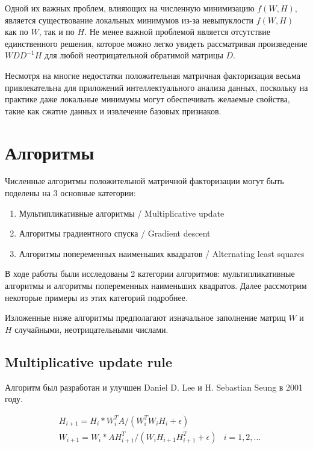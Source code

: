 Одной их важных проблем, влияющих на численную минимизацию $f(W, H)$, является существование локальных минимумов из-за невыпуклости $f(W, H)$ как по $W$, так и по $H$. Не менее важной проблемой является отсутствие единственного решения, которое можно легко увидеть рассматривая произведение $WDD^{− 1}H$ для любой неотрицательной обратимой матрицы $D$.

Несмотря на многие недостатки положительная матричная факторизация весьма привлекательна для приложений интеллектуального анализа данных, поскольку на практике даже локальные минимумы могут обеспечивать желаемые свойства, такие как сжатие данных и извлечение базовых признаков.


\section{Алгоритмы}

Численные алгоритмы положительной матричной факторизации могут быть поделены на 3 основные категории:
\begin{enumerate}
	\item Мультипликативные алгоритмы / Multiplicative update
	\item Алгоритмы градиентного спуска / Gradient descent
	\item Алгоритмы попеременных наименьших квадратов / Alternating least squares
\end{enumerate}

В ходе работы были исследованы 2 категории алгоритмов: мультипликативные алгоритмы и алгоритмы попеременных наименьших квадратов. Далее рассмотрим некоторые примеры из этих категорий подробнее.

Изложенные ниже алгоритмы предполагают изначальное заполнение матриц $W$ и $H$ случайными, неотрицательными числами.


\newpage


\subsection{Multiplicative update rule}

Алгоритм был разработан и улучшен Daniel D. Lee и H. Sebastian Seung в 2001 году.

\begin{align*}
	& H_{i+1} = H_i * W_i^T A / (W_i^T W_i H_i + \epsilon) \\
	& W_{i+1} = W_i * A H_{i+1}^T / (W_i H_{i+1} H_{i+1}^T + \epsilon) & i = 1, 2, ...
\end{align*}

